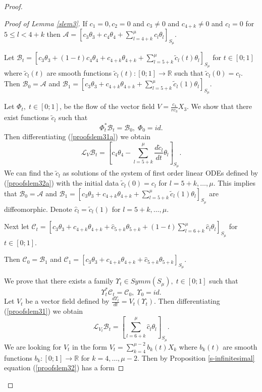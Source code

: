 \documentclass{amsart}
\theoremstyle{definition}
\numberwithin{equation}{section}
\begin{document}
\begin{proof}
\begin{proof}[Proof of Lemma \ref{slem3}]
\par \noindent If $c_1=0, c_2=0$ and $c_3 \neq 0$ and $c_{4+k} \ne 0$ and $c_l=0$ for $5\leq l< 4+k$ then
$\mathcal{A}= [c_3 \theta_3+c_4 \theta_4+\sum_{l=4+k}^{\mu}c_{l} \theta_{l}]_{S_{\mu}}$. \par \noindent  Let
$\mathcal{B}_t=[c_3 \theta_3+(1-t)c_4 \theta_4+c_{4+k} \theta_{4+k}+  \sum_{l=5+k}^{\mu}\widetilde{c}_{l}(t) \theta_{l}]_{S_{\mu}}$
\;for $t \in[0;1]$ where $\widetilde{c}_{l}(t)$ are smooth functions $\widetilde{c}_{l}(t):[0;1]\rightarrow \mathbb{R}$ such that $\widetilde{c}_{l}(0)=c_{l}$. Then $\mathcal{B}_0=\mathcal{A}$\; and
\;$\mathcal{B}_1=[c_3 \theta_3+c_{4+k} \theta_{4+k}+\sum_{l=5+k}^{\mu}\widetilde{c}_{l}(1) \theta_{l}]_{S_{\mu}}$.

Let $\Phi_t ,\;t\in [0;1]$, be the flow of the vector field $V=\frac{c_4}{rc_3}X_3$. We show that there exist functions $\widetilde{c}_l$ such that
\begin{equation}
\label{proofslem31a}   \Phi_t^*\mathcal{B}_t=\mathcal{B}_0,\;\Phi_0=id.
\end{equation}
Then differentiating (\ref{proofslem31a}) we obtain
  \begin{equation}
\label{proofslem32a}   \mathcal L_{V} \mathcal{B}_t=[c_4 \theta_4 -\sum_{l=5+k}^{\mu}\frac{d\widetilde{c}_{l}}{dt} \theta_{l}]_{S_{\mu}}.
\end{equation}
We can find the $\widetilde{c}_l$ as solutions of the system of first order linear ODEs defined by (\ref{proofslem32a}) with the initial data $\widetilde{c}_{l}(0)=c_{l}$ for $l=5+k,\ldots,\mu$. This implies that $\mathcal{B}_0=\mathcal{A}$ and $\mathcal{B}_1=[c_3 \theta_3+c_{4+k} \theta_{4+k}+\sum_{l=5+k}^{\mu}\widetilde{c}_{l}(1) \theta_{l}]_{S_{\mu}}$ are diffeomorphic.
Denote $\hat{c}_l=\widetilde{c}_l(1)$ for $l=5+k,\ldots,\mu$.

Next let $\mathcal{C}_t=[c_3 \theta_3+c_{4+k} \theta_{4+k}+\hat{c}_{5+k} \theta_{5+k}+(1-t)\sum_{l=6+k}^{\mu}\hat{c}_{l} \theta_{l}]_{S_{\mu}}$
\;for $t \in[0;1]$.

Then $\mathcal{C}_0=\mathcal{B}_1$\; and
\;$\mathcal{C}_1=[c_3 \theta_3+c_{4+k} \theta_{4+k}+\hat{c}_{5+k} \theta_{5+k}]_{S_{\mu}}$.

 We prove that there exists a family $\Upsilon_t \in Symm(S_{\mu}),\;t\in [0;1]$ such that
 \begin{equation}
\label{proofslem31}   \Upsilon_t^*\mathcal{C}_t=\mathcal{C}_0,\;\Upsilon_0=id.
\end{equation}
Let $V_t$ be a vector field defined by $\frac{d \Upsilon_t}{dt}=V_t(\Upsilon_t)$. Then differentiating (\ref{proofslem31}) we obtain
  \begin{equation}
\label{proofslem32}   \mathcal L_{V_t} \mathcal{B}_t=[\sum_{l=6+k}^{\mu}\hat{c}_{l} \theta_{l}]_{S_{\mu}}.
\end{equation}
We are looking for $V_t$ in the form $V_t=\sum_{k=4}^{\mu-2}b_k(t) X_k$   where  $b_k(t)$ are smooth functions $b_k:[0;1]\rightarrow \mathbb{R}$ for $k=4,\ldots,\mu-2$.  Then by Proposition  \ref{s-infinitesimal} equation (\ref{proofslem32})
has a form


\end{proof}
\end{proof}
\end{document}
